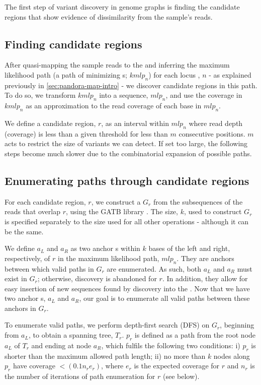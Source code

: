 The first step of \denovo{} variant discovery in genome graphs is finding the candidate regions that show evidence of dissimilarity from the sample's reads.

\subsection{Finding candidate regions}
\label{sec:denovo-candidate-regions}

After quasi-mapping the sample reads to the \panrg{} and inferring the maximum likelihood path (a path of minimizing \kmer{}s; $kmlp_n$) for each locus \prg{}, $n$ - as explained previously in \autoref{sec:pandora-map-intro} - we discover candidate regions in this path. To do so, we transform $kmlp_n$ into a sequence, $mlp_n$, and use the \kmer{} coverage in $kmlp_n$ as an approximation to the read coverage of each base in $mlp_n$.

We define a candidate region, $r$, as an interval within $mlp_n$ where read depth (coverage) is less than a given threshold for less than $m$ consecutive positions. $m$ acts to restrict the size of variants we can detect. If set too large, the following steps become much slower due to the combinatorial expansion of possible paths. 

\subsection{Enumerating paths through candidate regions}
\label{sec:path-enum}

For each candidate region, $r$, we construct a \dbg{} $G_r$ from the subsequences of the reads that overlap $r$, using the GATB library \cite{gatb2014}. The \kmer{} size, $k$, used to construct $G_r$ is specified separately to the \kmer{} size used for all other \pandora{} operations - although it can be the same. 

We define $a_L$ and $a_R$ as two anchor \kmer{}s within $k$ bases of the left and right, respectively, of $r$ in the maximum likelihood path, $mlp_n$. They are anchors between which valid paths in $G_r$ are enumerated. As such, both $a_L$ and $a_R$ must exist in $G_r$; otherwise, \denovo{} discovery is abandoned for $r$. In addition, they allow for easy insertion of new sequences found by \denovo{} discovery into the \prg{}. Now that we have two anchor \kmer{}s, $a_L$ and $a_R$, our goal is to enumerate all valid paths between these anchors in $G_r$.

To enumerate valid paths, we perform depth-first search (DFS) on $G_r$, beginning from $a_L$, to obtain a spanning tree, $T_r$. $p_r$ is defined as a path from the root node $a_L$ of $T_r$ and ending at node $a_R$, which fulfils the following two conditions: i) $p_r$ is shorter than the maximum allowed path length; ii) no more than $k$ nodes along $p_r$ have coverage $< (0.1 n_r e_r)$, where $e_r$ is the expected \kmer{} coverage for $r$ and $n_r$ is the number of iterations of path enumeration for $r$ (see below).

